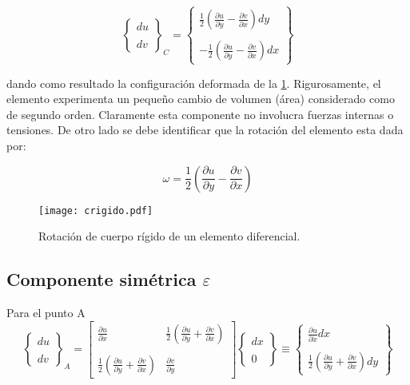 \documentclass[../notas medios.tex]{subfiles}
\begin{document}
\[{\left\{ {\begin{array}{*{20}{c}}
{du}\\\\
{dv}
\end{array}} \right\}_C} = \left\{ {\begin{array}{*{20}{c}}
{\frac{1}{2}\left( {\frac{{\partial u}}{{\partial y}} - \frac{{\partial v}}{{\partial x}}} \right)dy}\\\\
{ - \frac{1}{2}\left( {\frac{{\partial u}}{{\partial y}} - \frac{{\partial v}}{{\partial x}}} \right)dx}
\end{array}} \right\}\]

dando como resultado la configuración deformada de la \cref{crigido}. Rigurosamente, el elemento experimenta un pequeño cambio de volumen (área) considerado como de segundo orden. Claramente esta componente no involucra fuerzas internas o tensiones. De otro lado se debe identificar que la rotación del elemento esta dada por:

\[\omega = \frac{1}{2}\left( {\frac{{\partial u}}{{\partial y}} - \frac{{\partial v}}{{\partial x}}}\right)\]

\begin{figure}[H]
\centering
	\texttt{[image: crigido.pdf]}
	\caption{Rotación de cuerpo rígido de un elemento diferencial.}
	\label{crigido}
\end{figure}

\subsection{Componente simétrica $\varepsilon$}
Para el punto A
\[{\left\{ {\begin{array}{*{20}{c}}
{du}\\\\
{dv}
\end{array}} \right\}_A} = \left[ {\begin{array}{*{20}{c}}
{\frac{{\partial u}}{{\partial x}}}&{\frac{1}{2}\left( {\frac{{\partial u}}{{\partial y}} + \frac{{\partial v}}{{\partial x}}} \right)}\\\\
{\frac{1}{2}\left( {\frac{{\partial u}}{{\partial y}} + \frac{{\partial v}}{{\partial x}}} \right)}&{\frac{{\partial v}}{{\partial y}}}
\end{array}} \right]\left\{ {\begin{array}{*{20}{c}}
{dx}\\\\
0
\end{array}} \right\} \equiv \left\{ {\begin{array}{*{20}{c}}
{\frac{{\partial u}}{{\partial x}}dx}\\\\
{\frac{1}{2}\left( {\frac{{\partial u}}{{\partial y}} + \frac{{\partial v}}{{\partial x}}} \right)dy}
\end{array}} \right\}\]
\end{document}
